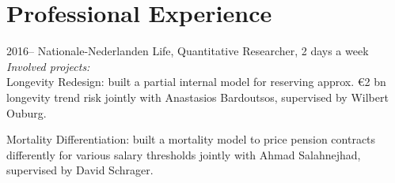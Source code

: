 \documentclass[12pt,letterpaper]{report}
\begin{document}
 \section*{Professional Experience}

\begin{tablist}
	
	\item[2016--] \tab Nationale-Nederlanden Life, Quantitative Researcher, 2 days a week\\
	\medskip
	\textit{Involved projects:}\\
	Longevity Redesign: built a partial internal model for reserving approx. €2 bn longevity trend risk jointly with Anastasios Bardoutsos, supervised by Wilbert Ouburg.\\
	
	\medskip
	
	Mortality Differentiation: built a mortality model to price pension contracts differently for various salary thresholds jointly with Ahmad Salahnejhad, supervised by David Schrager.
	
	\medskip
	
	
	

%	
	
\end{tablist}

%
%
%		
		
		
		
\end{document}
